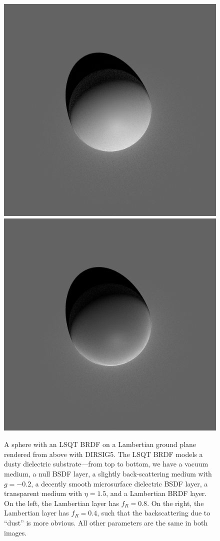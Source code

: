 \documentclass[
    twoside,
    twocolumn,
    letterpaper,
    10pt]{article}
\begin{document}
\begin{figure}
\begin{center}
    \includegraphics[width=0.75\columnwidth]{example1.png}%
    \hspace{0.05\linewidth}%
    \includegraphics[width=0.75\columnwidth]{example2.png}
    \caption{A sphere with an LSQT BRDF on a Lambertian ground plane 
        rendered from above with DIRSIG5. The LSQT BRDF models a
        dusty dielectric substrate---from top to bottom, we have a 
        vacuum medium, a null BSDF layer, a slightly back-scattering 
        medium with $g=-0.2$, a decently smooth microsurface dielectric 
        BSDF layer, a transparent medium with $\eta=1.5$, 
        and a Lambertian BRDF layer. On the left, the Lambertian
        layer has $f_R=0.8$. On the right, the Lambertian layer has 
        $f_R=0.4$, such that the backscattering due to ``dust'' is
        more obvious. All other parameters are the same in both images.}
\end{center}
\end{figure}
\end{document}
